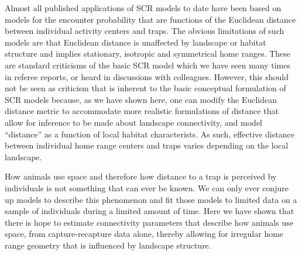 Almost
all published applications of SCR models to date have been based on
models for the encounter probability that are functions of the
Euclidean distance between individual activity centers and traps. The
obvious limitations of such models are that Euclidean
distance is unaffected by landscape or habitat
structure and implies stationary, isotropic and symmetrical home
ranges. These are standard criticisms of the basic SCR model which we
have seen many times in referee reports, or heard in discussions with
colleagues. However, this should not be seen as criticism
that is inherent to the basic conceptual formulation of SCR models because,
as we have shown here, %
one can modify the Euclidean distance metric
to accommodate more realistic
formulations of distance that allow for inference to be made about
landscape connectivity, and model ``distance'' as a function of
local habitat characterists. As such, effective distance between individual home
range centers and traps varies depending on the local landscape.

How animals use space and therefore how distance to a trap is
perceived by individuals is not something that can ever be known. We
can only ever conjure up models to describe this phenomenon and fit
those models to limited data on a sample of individuals during a
limited amount of time.  Here we have shown that there is hope to
estimate connectivity parameters
that describe how
animals use space,  from capture-recapture data alone,
thereby allowing  for irregular home range geometry
that is influenced by landscape structure.

